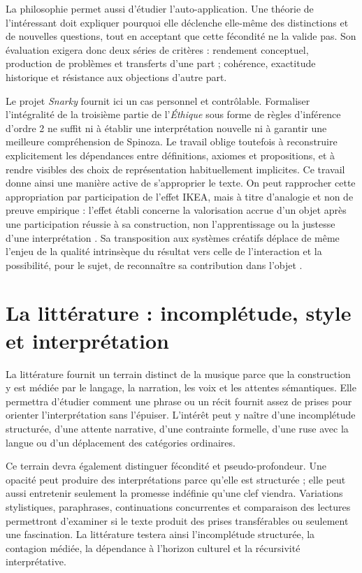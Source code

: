 \documentclass[11pt,a4paper]{article}
\begin{document}
La philosophie permet aussi d'étudier l'auto-application. Une théorie de
l'intéressant doit expliquer pourquoi elle déclenche elle-même des distinctions
et de nouvelles questions, tout en acceptant que cette fécondité ne la valide pas. Son
évaluation exigera donc deux séries de critères : rendement conceptuel,
production de problèmes et transferts d'une part ; cohérence, exactitude
historique et résistance aux objections d'autre part.

Le projet \emph{Snarky} fournit ici un cas personnel et contrôlable. Formaliser
l'intégralité de la troisième partie de l'\emph{Éthique} sous forme de règles
d'inférence d'ordre 2 ne suffit ni à établir une interprétation nouvelle ni à
garantir une meilleure compréhension de Spinoza. Le travail oblige toutefois à
reconstruire explicitement les dépendances entre définitions, axiomes et
propositions, et à rendre visibles des choix de représentation habituellement
implicites. Ce travail donne ainsi une manière active de s'approprier le texte.
On peut rapprocher cette appropriation par participation de l'effet IKEA,
mais à titre d'analogie et non de preuve empirique : l'effet établi concerne la
valorisation accrue d'un objet après une participation réussie à sa construction,
non l'apprentissage ou la justesse d'une interprétation
\parencite{norton2012ikea}. Sa transposition aux systèmes créatifs déplace de
même l'enjeu de la qualité intrinsèque du résultat vers celle de l'interaction et
la possibilité, pour le sujet, de reconnaître sa contribution dans l'objet
\parencite[152--153]{pachet2026generation}.

\section{La littérature : incomplétude, style et interprétation}

La littérature fournit un terrain distinct de la musique parce que la
construction y est médiée par le langage, la narration, les voix et les attentes
sémantiques. Elle permettra d'étudier comment une phrase ou un récit fournit
assez de prises pour orienter l'interprétation sans l'épuiser. L'intérêt peut y
naître d'une incomplétude structurée, d'une attente narrative, d'une contrainte
formelle, d'une ruse avec la langue ou d'un déplacement des catégories
ordinaires.

Ce terrain devra également distinguer fécondité et pseudo-profondeur. Une
opacité peut produire des interprétations parce qu'elle est structurée ; elle
peut aussi entretenir seulement la promesse indéfinie qu'une clef viendra.
Variations stylistiques, paraphrases, continuations concurrentes et comparaison
des lectures permettront d'examiner si le texte produit des prises
transférables ou seulement une fascination. La littérature testera ainsi
l'incomplétude structurée, la contagion médiée, la dépendance à l'horizon
culturel et la récursivité interprétative.
\end{document}
